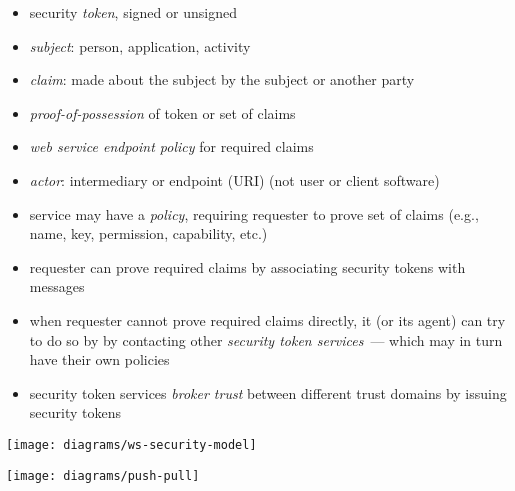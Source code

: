 \documentclass{sepslide-soa-faked} %
\begin{document}
\begin{slide}
	\begin{itemize}
	\item security \emph{token}, signed or unsigned
	\item \emph{subject}: person, application, activity 
	\item \emph{claim}: made about the subject by the subject or another party

	\item \emph{proof-of-possession} of token or set of claims
	\item \emph{web service endpoint policy} for required claims
	\item \emph{actor}: intermediary or endpoint (URI)
			(not user or client software)
	\end{itemize}

\end{slide}

\begin{slide}

	\begin{itemize} 
	\item service may have a \emph{policy}, requiring
	requester to prove set of claims (e.g., name, key,
	permission, capability, etc.)

	\item requester can prove required
	claims by associating security tokens with messages

	\item when requester cannot prove required claims directly, it
	(or its agent) can try to do so by
        by contacting other \emph{security token services}~---
 which may in turn have their own policies

	\item security token services \emph{broker trust} between
          different trust domains by issuing security tokens
\end{itemize}
\end{slide}
\begin{slide}
\begin{center}
	\texttt{[image: diagrams/ws-security-model]}
\end{center}
\end{slide}

\begin{slide}
\texttt{[image: diagrams/push-pull]}
\end{slide}
\end{document}

